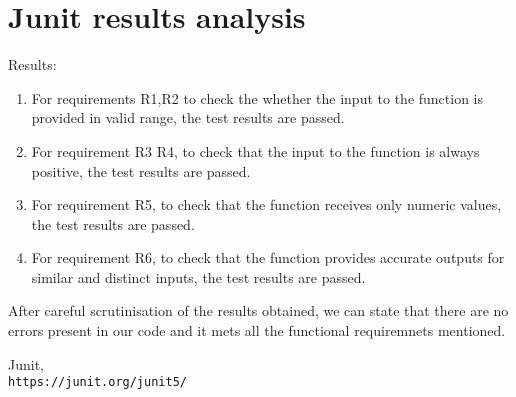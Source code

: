 \documentclass[12pt]{report}
\begin{document}
\section{Junit results analysis}

Results:
\begin{enumerate}
    \item For requirements R1,R2 to check the whether the input to the function is provided in valid range, the test results are passed.
    \item For requirement R3 R4, to check that the input to the function is always positive, the test results are passed.
    \item For requirement R5, to check that the function receives only numeric values, the test results are passed. 
    \item For requirement R6, to check that the function provides accurate outputs for similar and distinct inputs, the test results are passed.
\end{enumerate}

After careful scrutinisation of the results obtained, we can state that there are no errors present in our code and it mets all the functional requiremnets mentioned.
\newpage
\begin{thebibliography}{9}

Junit,
\\\texttt{https://junit.org/junit5/}

\end{thebibliography}
\end{document}
